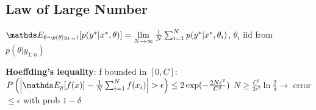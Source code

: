 %
%
%
%


\subsection{Law of Large Number}
$\E[\theta \sim p(\theta|y_{1:n})]{p(y^{*}|x^{*}, \theta)} =
\lim\limits_{N \to \infty} \frac{1}{N} \sum_{i=1}^{N}p(y^{*}|x^{*}, \theta_{i})$, $\theta_{i}$ iid from $p(\theta|y_{1:n})$

\textbf{Hoeffding's iequality}: f bounded in $\left[0,C\right]$: $P\bb{\abs{\E[p]{f(x)}-\frac{1}{N}
\sum_{i=1}^{N}f(x_{i})} > \epsilon} \leq 2\exp(-\frac{2N\epsilon^{2}}{C^2})$
$N \geq \frac{C^2}{2\epsilon^2}\ln{\frac{2}{\delta}} \rightarrow$ error $\leq \epsilon$ with prob $1 - \delta$




